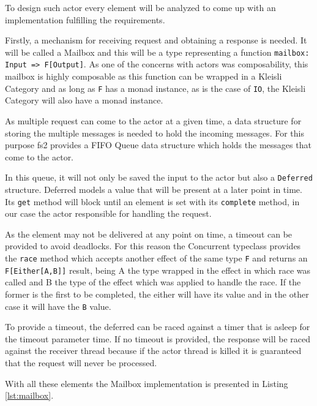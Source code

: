 \documentclass[../main.tex]{subfiles}
\begin{document}
To design such actor every element will be analyzed to come up with
an implementation fulfilling the requirements.

Firstly, a mechanism for receiving request and obtaining a
response is needed. It will be called a Mailbox and this will be a type representing a function
\lstinline{mailbox: Input => F[Output]}. As one of the concerns with actors was
composability, this mailbox is highly composable as this function can be wrapped
in a Kleisli Category and as long as \texttt{F} has a monad instance, as is the case of
\texttt{IO}, the Kleisli Category will also have a monad instance.

As multiple request can come to the actor at a given time, a data structure for
storing the multiple messages is needed to hold the incoming messages. For this
purpose fs2 provides a FIFO Queue data structure which holds the messages that
come to the actor.

In this queue, it will not only be saved the input to the actor but also a
\texttt{Deferred} structure. Deferred models a value that will be present at a
later point in time. Its \texttt{get} method will block until an element is set
with its \texttt{complete} method, in our case the actor responsible for
handling the request.

As the element may not be delivered at any point on time,
a timeout can be provided to avoid deadlocks. For this reason the Concurrent
typeclass provides the \texttt{race} method which accepts another effect of the same type
\texttt{F} and returns an \texttt{F[Either[A,B]]} result, being A the type
wrapped in the effect in which race was called and B the type of the effect
which was applied to handle the race. If the former is the first to be completed, the
either will have its value and in the other case it will have the \texttt{B}
value.

To provide a timeout, the deferred can be raced against a timer that is
asleep for the timeout parameter time. If no timeout is provided, the response
will be raced against the receiver thread because if the actor thread is killed
it is guaranteed that the request will never be processed.

With all these elements the Mailbox implementation is presented in Listing
\ref{lst:mailbox}.
\end{document}
